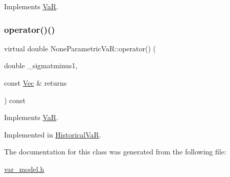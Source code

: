 Implements \hyperlink{classVaR_a28e1a1be9e386ed4e8503e54db4033bd}{VaR}.

\hypertarget{classNoneParametricVaR_a958aae1b9bc03a8ef87295df30db76f7}{}\label{classNoneParametricVaR_a958aae1b9bc03a8ef87295df30db76f7} 
\subsubsection{\texorpdfstring{operator()()}{operator()()}\hspace{0.1cm}{\footnotesize\ttfamily [3/3]}}
{\footnotesize\ttfamily virtual double None\+Parametric\+Va\+R\+::operator() (\begin{DoxyParamCaption}\item[{double}]{\+\_\+sigmatminus1,  }\item[{const \hyperlink{compute__returns__eigen_8h_a1eb6a9306ef406d7975f3cbf2e247777}{Vec} \&}]{returns }\end{DoxyParamCaption}) const\hspace{0.3cm}{\ttfamily [pure virtual]}}



Implements \hyperlink{classVaR_a31cb62626488715a9133679feaba31e5}{VaR}.



Implemented in \hyperlink{classHistoricalVaR_a472b04dc9a4c5989be0e7198bc9c4189}{Historical\+VaR}.



The documentation for this class was generated from the following file\+:\begin{DoxyCompactItemize}
\item 
\hyperlink{var__model_8h}{var\+\_\+model.\+h}\end{DoxyCompactItemize}
